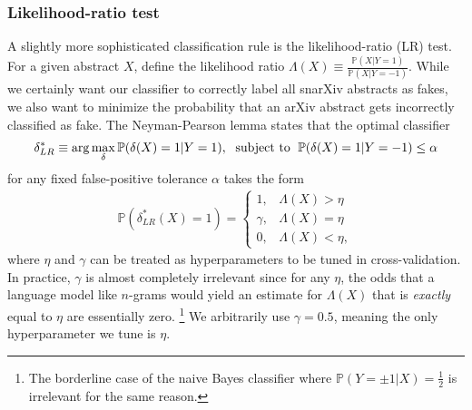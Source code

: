 \documentclass{article}
\renewcommand{\P}{\mathbb{P}}
\begin{document}
\subsubsection{Likelihood-ratio test}
A slightly more sophisticated classification rule is the likelihood-ratio (LR) test.
For a given abstract $X$, define the likelihood ratio $\Lambda(X)\equiv\frac{\P(X|Y=1)}{\P(X|Y=-1)}$.
While we certainly want our classifier to correctly label all snarXiv abstracts as fakes, we also want to minimize the probability that an arXiv abstract gets incorrectly classified as fake.
The Neyman-Pearson lemma states that the optimal classifier
%
\begin{align}
	\delta_{LR}^* \equiv \arg\max_\delta \P(\delta(X)=1|Y=1), \text{\; subject to \;} \P(\delta(X)=1|Y=-1)\leq \alpha
\end{align}
%
for any fixed false-positive tolerance $\alpha$ takes the form
%
\begin{align}
	\P\left(\delta_{LR}^*(X)=1\right) =
	\begin{cases}
		1, 	& \Lambda(X) > \eta \\
		\gamma, & \Lambda(X) = \eta \\
		0, 	& \Lambda(X) < \eta,
	\end{cases}
\end{align}
%
where $\eta$ and $\gamma$ can be treated as hyperparameters to be tuned in cross-validation.
In practice, $\gamma$ is almost completely irrelevant since for any $\eta$, the odds that a language model like $n$-grams would yield an estimate for $\Lambda(X)$ that is \textit{exactly} equal to $\eta$ are essentially zero.%
\footnote{The borderline case of the naive Bayes classifier where $\P(Y=\pm1|X)=\frac{1}{2}$ is irrelevant for the same reason.}
%
We arbitrarily use $\gamma=0.5$, meaning the only hyperparameter we tune is $\eta$.
\end{document}

